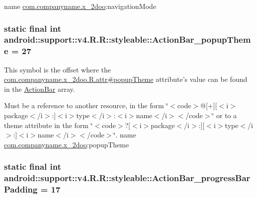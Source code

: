name \hyperlink{namespacecom_1_1companyname_1_1x__2doo}{com.companyname.x\_\-2doo}:navigationMode \hypertarget{classandroid_1_1support_1_1v4_1_1_r_1_1styleable_fbc82042283d6f161c64d06b055e15dc}{
\subsubsection[{ActionBar\_\-popupTheme}]{\setlength{\rightskip}{0pt plus 5cm}static final int android::support::v4.R.R::styleable::ActionBar\_\-popupTheme = 27}}
\label{classandroid_1_1support_1_1v4_1_1_r_1_1styleable_fbc82042283d6f161c64d06b055e15dc}


This symbol is the offset where the \hyperlink{classcom_1_1companyname_1_1x__2doo_1_1_r_1_1attr_d403115dfb9e747c8d3dcd84eb00fe4b}{com.companyname.x\_\-2doo.R.attr\#popupTheme} attribute's value can be found in the \hyperlink{classandroid_1_1support_1_1v4_1_1_r_1_1styleable_5c6cf2c83551ebae05f365bb913fdddf}{ActionBar} array.

Must be a reference to another resource, in the form \char`\"{}$<$code$>$@\mbox{[}+\mbox{]}\mbox{[}$<$i$>$package$<$/i$>$:\mbox{]}$<$i$>$type$<$/i$>$:$<$i$>$name$<$/i$>$$<$/code$>$\char`\"{} or to a theme attribute in the form \char`\"{}$<$code$>$?\mbox{[}$<$i$>$package$<$/i$>$:\mbox{]}\mbox{[}$<$i$>$type$<$/i$>$:\mbox{]}$<$i$>$name$<$/i$>$$<$/code$>$\char`\"{}.  name \hyperlink{namespacecom_1_1companyname_1_1x__2doo}{com.companyname.x\_\-2doo}:popupTheme \hypertarget{classandroid_1_1support_1_1v4_1_1_r_1_1styleable_86bc83c8961f6605b5d3fa0a1ae7ec1c}{
\subsubsection[{ActionBar\_\-progressBarPadding}]{\setlength{\rightskip}{0pt plus 5cm}static final int android::support::v4.R.R::styleable::ActionBar\_\-progressBarPadding = 17}}
\label{classandroid_1_1support_1_1v4_1_1_r_1_1styleable_86bc83c8961f6605b5d3fa0a1ae7ec1c}


